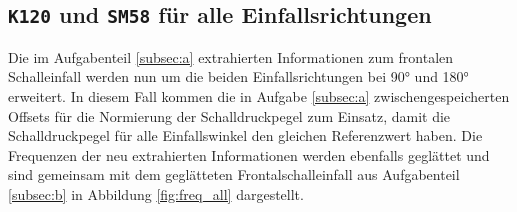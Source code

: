\subsection{\texttt{K120} und \texttt{SM58} für alle Einfallsrichtungen}
\label{subsec:c}
Die im Aufgabenteil \ref{subsec:a} extrahierten Informationen zum frontalen Schalleinfall werden nun um die beiden Einfallsrichtungen bei 90° und 180° erweitert.
In diesem Fall kommen die in Aufgabe \ref{subsec:a} zwischengespeicherten Offsets für die Normierung der Schalldruckpegel zum Einsatz, damit die Schalldruckpegel für alle Einfallswinkel den gleichen Referenzwert haben.
Die Frequenzen der neu extrahierten Informationen werden ebenfalls geglättet und sind gemeinsam mit dem geglätteten Frontalschalleinfall aus Aufgabenteil \ref{subsec:b} in Abbildung \ref{fig:freq_all} dargestellt.


